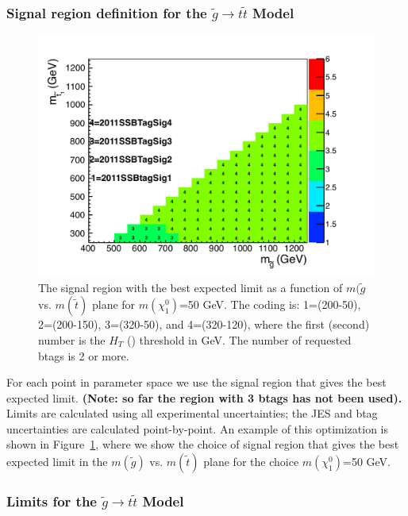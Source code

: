 \subsubsection{Signal region definition for the $\widetilde{g} \to t\widetilde{t}$ Model}
\label{sec:firststopdefinition}

\begin{figure}[htb]
\begin{center}
\includegraphics[width=0.65\linewidth]{figs/gluinostopsigreg.pdf}
\caption{The signal region with the best expected limit as a function of 
$m(\widetilde{g}$ vs. $m(\widetilde{t})$ plane for $m(\chi^0_1)$=50 GeV.
The coding is: 1=(200-50), 2=(200-150), 3=(320-50), and 4=(320-120), where
the first (second) number is the $H_T$ (\met) threshold in GeV. The number
of requested btags is 2 or more.
\label{fig:gluinostoptimize}}
\end{center}
\end{figure}


For each point in parameter space we use the signal region that gives
the best expected limit.  
{\bf (Note: so far the region with 3 btags has not been used).}
Limits are calculated using all experimental
uncertainties; the JES and btag uncertainties are calculated point-by-point.
An example of this optimization is shown in Figure~\ref{fig:gluinostoptimize},
where we show the choice of signal region that gives the best expected limit
in the $m(\widetilde{g})$ vs. $m(\widetilde{t})$ plane for the choice
$m(\chi^0_1)$=50 GeV.




\subsubsection{Limits for the $\widetilde{g} \to t\widetilde{t}$ Model}
\label{sec:firststoplimits}



